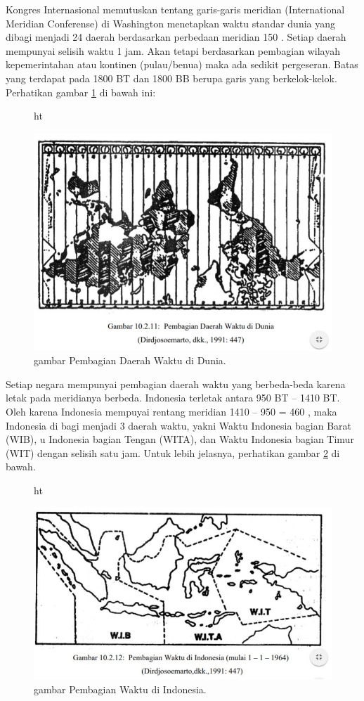  Kongres Internasional memutuskan tentang garis-garis meridian (International Meridian Conferense) 
 di Washington menetapkan waktu standar dunia yang dibagi menjadi 24 daerah berdasarkan
 perbedaan meridian 150 . Setiap daerah mempunyai selisih waktu 1 jam.
 Akan tetapi berdasarkan pembagian wilayah kepemerintahan atau kontinen (pulau/benua)
 maka ada sedikit pergeseran. Batas yang terdapat pada 1800 BT dan 1800 BB berupa garis
 yang berkelok-kelok. Perhatikan gambar \ref{sejarahwaktu_Capture1} di bawah ini:
 
 \begin{figure}{ht}
 \centerline{\includegraphics[width=1\textwidth]{figures/sejarahwaktu_Capture1.JPG}}
 \caption{gambar Pembagian Daerah Waktu di Dunia.}
 \label{sejarahwaktu_Capture1}
 \end{figure}
 
 
Setiap negara mempunyai pembagian daerah waktu yang berbeda-beda karena letak pada meridianya berbeda. 
 Indonesia terletak antara 950 BT – 1410 BT. Oleh karena Indonesia mempuyai rentang meridian 1410 – 950 = 460 , 
 maka Indonesia di bagi menjadi 3 daerah waktu, yakni Waktu Indonesia bagian Barat (WIB),
 u Indonesia bagian Tengan (WITA), dan Waktu Indonesia bagian Timur (WIT) dengan selisih
 satu jam. Untuk lebih jelasnya,  perhatikan gambar \ref{sejarahwaktu_Capture2} di bawah.
 
 \begin{figure}{ht}
 \centerline{\includegraphics[width=1\textwidth]{figures/sejarahwaktu_Capture2.JPG}}
 \caption{gambar Pembagian Waktu di Indonesia.}
 \label{sejarahwaktu_Capture2}
 \end{figure}
 

